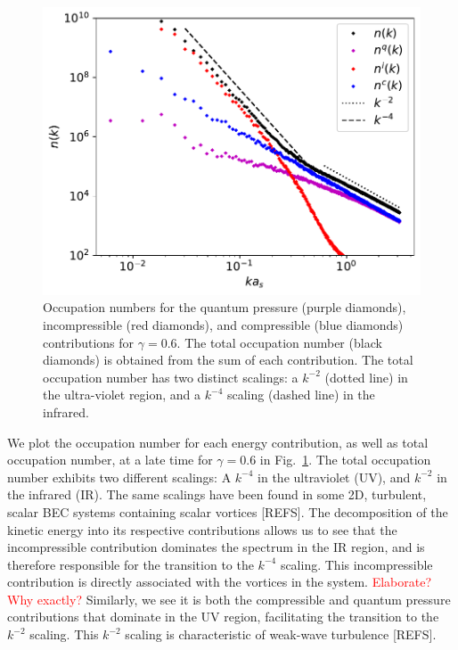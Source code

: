 \begin{figure}[t!]
    \centering
    \includegraphics[scale=0.75]{gfx/ch-twoCompDynamics/spectra.pdf}
    \caption{Occupation numbers for the quantum pressure (purple diamonds),
    incompressible (red diamonds), and compressible (blue diamonds)
    contributions for \(\gamma=0.6\).
    The total occupation number (black diamonds) is obtained from the sum of
    each contribution.
    The total occupation number has two distinct scalings: a \(k^{-2}\) 
    (dotted line) in the ultra-violet region, and a \(k^{-4}\) scaling
    (dashed line) in the infrared.\label{fig:kinetic-energy-spectra}}
\end{figure}
We plot the occupation number for each energy contribution, as well as total
occupation number, at a late time for \(\gamma=0.6\) in
Fig.~\ref{fig:kinetic-energy-spectra}.
The total occupation number exhibits two different scalings: A \(k^{-4}\) in the
ultraviolet (UV), and \(k^{-2}\) in the infrared (IR). 
The same scalings have been found in some 2D, turbulent, scalar BEC systems
containing scalar vortices [REFS].
The decomposition of the kinetic energy into its respective contributions
allows us to see that the incompressible contribution dominates the spectrum
in the IR region, and is therefore responsible for the transition to the
\(k^{-4}\) scaling.
This incompressible contribution is directly associated with the vortices in
the system. \textcolor{red}{Elaborate? Why exactly?}
Similarly, we see it is both the compressible and quantum pressure contributions
that dominate in the UV region, facilitating the transition to the \(k^{-2}\)
scaling.
This \(k^{-2}\) scaling is characteristic of weak-wave turbulence [REFS].

